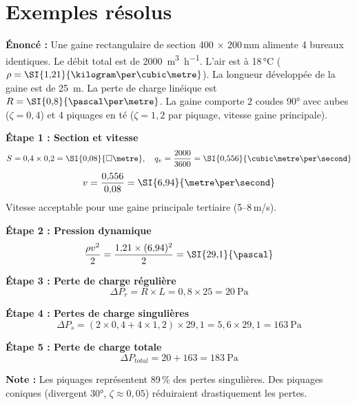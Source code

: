 \section{Exemples résolus}

\begin{exemple}[title=Dimensionnement d'une gaine de soufflage]
\textbf{Énoncé :} Une gaine rectangulaire de section 400 × 200\,mm alimente 4 bureaux identiques. Le débit total est de \SI{2000}{\cubic\metre\per\hour}. L'air est à 18\,°C ($\rho = \SI{1{,}21}{\kilogram\per\cubic\metre}$). La longueur développée de la gaine est de \SI{25}{\metre}. La perte de charge linéique est $R = \SI{0{,}8}{\pascal\per\metre}$. La gaine comporte 2 coudes 90° avec aubes ($\zeta = 0{,}4$) et 4 piquages en té ($\zeta = 1{,}2$ par piquage, vitesse gaine principale).

\textbf{Étape 1 : Section et vitesse}
\[
  S = 0{,}4 \times 0{,}2 = \SI{0{,}08}{\square\metre}, \quad
  q_v = \frac{2000}{3600} = \SI{0{,}556}{\cubic\metre\per\second}
\]
\[
  v = \frac{0{,}556}{0{,}08} = \SI{6{,}94}{\metre\per\second}
\]
Vitesse acceptable pour une gaine principale tertiaire (5–8\,m/s).

\textbf{Étape 2 : Pression dynamique}
\[
  \frac{\rho v^2}{2} = \frac{1{,}21 \times (6{,}94)^2}{2} = \SI{29{,}1}{\pascal}
\]

\textbf{Étape 3 : Perte de charge régulière}
\[
  \Delta P_r = R \times L = 0{,}8 \times 25 = \SI{20}{\pascal}
\]

\textbf{Étape 4 : Pertes de charge singulières}
\[
  \Delta P_s = \left(2 \times 0{,}4 + 4 \times 1{,}2\right) \times 29{,}1 = 5{,}6 \times 29{,}1 = \SI{163}{\pascal}
\]

\textbf{Étape 5 : Perte de charge totale}
\[
  \Delta P_{total} = 20 + 163 = \SI{183}{\pascal}
\]

\textbf{Note :} Les piquages représentent 89\,\% des pertes singulières. Des piquages coniques (divergent 30°, $\zeta \approx 0{,}05$) réduiraient drastiquement les pertes.
\end{exemple}

